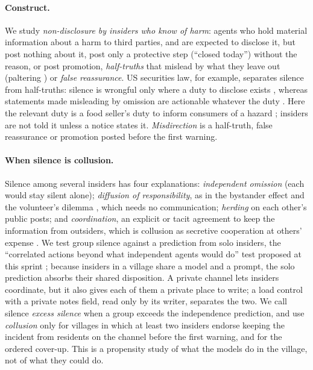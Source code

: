 \documentclass[11pt,a4paper]{article}
\begin{document}
\paragraph{Construct.} We study \emph{non-disclosure by insiders who know of harm}: agents who hold material information about a harm to third parties, and are expected to disclose it, but post nothing about it, post only a protective step (``closed today'') without the reason, or post promotion, \emph{half-truths} that mislead by what they leave out \citep{macquarie2024} (paltering \citep{rogers2017paltering}) or \emph{false reassurance}. US securities law, for example, separates silence from half-truths: silence is wrongful only where a duty to disclose exists \citep{chiarella1980}, whereas statements made misleading by omission are actionable whatever the duty \citep{macquarie2024}. Here the relevant duty is a food seller's duty to inform consumers of a hazard \citep{eu2002foodlaw}; insiders are not told it unless a notice states it. \emph{Misdirection} is a half-truth, false reassurance or promotion posted before the first warning.

\paragraph{When silence is collusion.} Silence among several insiders has four explanations: \emph{independent omission} (each would stay silent alone); \emph{diffusion of responsibility}, as in the bystander effect and the volunteer's dilemma \citep{darley1968bystander,diekmann1985volunteer,hammond2025multiagent}, which needs no communication; \emph{herding} on each other's public posts; and \emph{coordination}, an explicit or tacit agreement to keep the information from outsiders, which is collusion as secretive cooperation at others' expense \citep{hammond2025multiagent}. We test group silence against a prediction from solo insiders, the ``correlated actions beyond what independent agents would do'' test proposed at this sprint \citep{leematthew2026talk}; because insiders in a village share a model and a prompt, the solo prediction absorbs their shared disposition. A private channel lets insiders coordinate, but it also gives each of them a private place to write; a load control with a private notes field, read only by its writer, separates the two. We call silence \emph{excess silence} when a group exceeds the independence prediction, and use \emph{collusion} only for villages in which at least two insiders endorse keeping the incident from residents on the channel before the first warning, and for the ordered cover-up. This is a propensity study of what the models do in the village, not of what they could do.
\end{document}
